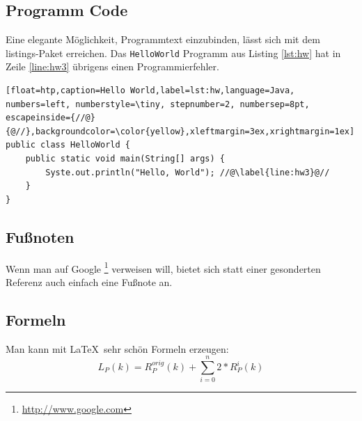 \subsection{Programm Code}
Eine elegante Möglichkeit, Programmtext einzubinden, lässt sich mit dem listings-Paket erreichen.
Das \verb|HelloWorld| Programm aus Listing \ref{lst:hw} hat in Zeile \ref{line:hw3} übrigens einen Programmierfehler.
\begin{lstlisting}[float=htp,caption=Hello World,label=lst:hw,language=Java, numbers=left, numberstyle=\tiny, stepnumber=2, numbersep=8pt, escapeinside={//@}{@//},backgroundcolor=\color{yellow},xleftmargin=3ex,xrightmargin=1ex]
public class HelloWorld {
    public static void main(String[] args) {
        Syste.out.println("Hello, World"); //@\label{line:hw3}@//
    }
}
\end{lstlisting}

\subsection{Fußnoten}
Wenn man auf Google \footnote{\url{http://www.google.com}} verweisen will, bietet sich statt einer gesonderten
Referenz auch einfach eine Fußnote an.
\subsection{Formeln}
Man kann mit \LaTeX\ sehr schön Formeln erzeugen:
$$L_{P}(k) = R^{orig}_{P}(k) + \sum_{i=0}^n 2*R^{i}_{P}(k)$$
